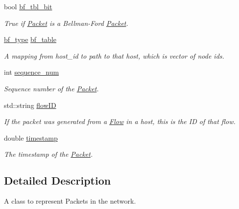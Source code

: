 \begin{DoxyCompactItemize}
bool \hyperlink{classPacket_ab3bb221061fb274a23f041e4b5e93ce7}{bf\-\_\-tbl\-\_\-bit}
\begin{DoxyCompactList}\small\item\em \-True if \hyperlink{classPacket}{\-Packet} is a \-Bellman-\/\-Ford \hyperlink{classPacket}{\-Packet}. \end{DoxyCompactList}\item 
\hypertarget{classPacket_ad19b836a6a6deab55ec66cb333642a5e}{\hyperlink{classPacket_a4cae1612a245ea2eadde0066ecc4b990}{bf\-\_\-type} \hyperlink{classPacket_ad19b836a6a6deab55ec66cb333642a5e}{bf\-\_\-table}}\label{classPacket_ad19b836a6a6deab55ec66cb333642a5e}

\begin{DoxyCompactList}\small\item\em \-A mapping from host\-\_\-id to path to that host, which is vector of node ids. \end{DoxyCompactList}\item 
int \hyperlink{classPacket_a1dcc152b6caa339c9d6f86c0fcde1c52}{sequence\-\_\-num}
\begin{DoxyCompactList}\small\item\em \-Sequence number of the \hyperlink{classPacket}{\-Packet}. \end{DoxyCompactList}\item 
\hypertarget{classPacket_ad841c025e14798586e5a01dfb17a8e56}{std\-::string \hyperlink{classPacket_ad841c025e14798586e5a01dfb17a8e56}{flow\-I\-D}}\label{classPacket_ad841c025e14798586e5a01dfb17a8e56}

\begin{DoxyCompactList}\small\item\em \-If the packet was generated from a \hyperlink{classFlow}{\-Flow} in a host, this is the \-I\-D of that flow. \end{DoxyCompactList}\item 
double \hyperlink{classPacket_a3c6b8af8bd18da132511da84aaba3acb}{timestamp}
\begin{DoxyCompactList}\small\item\em \-The timestamp of the \hyperlink{classPacket}{\-Packet}. \end{DoxyCompactList}\end{DoxyCompactItemize}


\subsection{\-Detailed \-Description}
\-A class to represent \-Packets in the network. 

